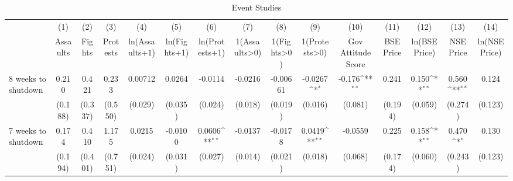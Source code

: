 \begin{table}[htbp]\centering
\def\sym#1{\ifmmode^{#1}\else\(^{#1}\)\fi}
\caption{Event Studies\label{tab:eventstudies}}
\begin{tabular}{l*{14}{c}}
\hline\hline
                    &\multicolumn{1}{c}{(1)}&\multicolumn{1}{c}{(2)}&\multicolumn{1}{c}{(3)}&\multicolumn{1}{c}{(4)}&\multicolumn{1}{c}{(5)}&\multicolumn{1}{c}{(6)}&\multicolumn{1}{c}{(7)}&\multicolumn{1}{c}{(8)}&\multicolumn{1}{c}{(9)}&\multicolumn{1}{c}{(10)}&\multicolumn{1}{c}{(11)}&\multicolumn{1}{c}{(12)}&\multicolumn{1}{c}{(13)}&\multicolumn{1}{c}{(14)}\\
                    &\multicolumn{1}{c}{Assaults}&\multicolumn{1}{c}{Fights}&\multicolumn{1}{c}{Protests}&\multicolumn{1}{c}{ln(Assaults+1)}&\multicolumn{1}{c}{ln(Fights+1)}&\multicolumn{1}{c}{ln(Protests+1)}&\multicolumn{1}{c}{1(Assaults>0)}&\multicolumn{1}{c}{1(Fights>0)}&\multicolumn{1}{c}{1(Protests>0)}&\multicolumn{1}{c}{Gov Attitude Score}&\multicolumn{1}{c}{BSE Price}&\multicolumn{1}{c}{ln(BSE Price)}&\multicolumn{1}{c}{NSE Price}&\multicolumn{1}{c}{ln(NSE Price)}\\
\hline
8 weeks to shutdown &       0.210         &       0.421         &       0.233         &     0.00712         &      0.0264         &     -0.0114         &     -0.0216         &    -0.00661         &     -0.0267\sym{*}  &      -0.176\sym{**} &       0.241         &       0.150\sym{**} &       0.560\sym{**} &       0.124         \\
                    &     (0.188)         &     (0.337)         &     (0.550)         &     (0.029)         &     (0.035)         &     (0.024)         &     (0.018)         &     (0.019)         &     (0.016)         &     (0.081)         &     (0.194)         &     (0.059)         &     (0.274)         &     (0.123)         \\
[1em]
7 weeks to shutdown &       0.174         &       0.410         &       1.175         &      0.0215         &     -0.0100         &      0.0606\sym{**} &     -0.0137         &     -0.0178         &      0.0419\sym{**} &     -0.0559         &       0.225         &       0.158\sym{**} &       0.470\sym{*}  &       0.130         \\
                    &     (0.194)         &     (0.401)         &     (0.751)         &     (0.024)         &     (0.031)         &     (0.027)         &     (0.014)         &     (0.021)         &     (0.018)         &     (0.068)         &     (0.174)         &     (0.060)         &     (0.243)         &     (0.123)         \\

\end{tabular}
\end{table}
